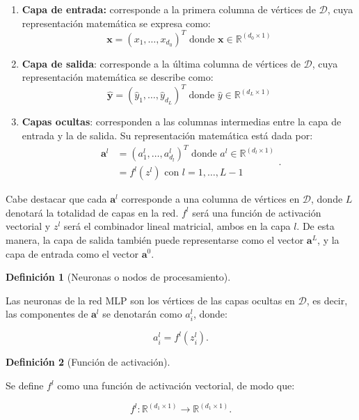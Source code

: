 \documentclass[
  us-letterpaper,
]{scrreprt}
\theoremstyle{definition}
\theoremstyle{plain}
\theoremstyle{plain}
\theoremstyle{definition}
\newtheorem{definition}{Definición}[chapter]
\theoremstyle{remark}
\begin{document}
\begin{enumerate}
\def\labelenumi{\arabic{enumi}.}
\item
  \textbf{Capa de entrada:} corresponde a la primera columna de vértices
  de \(\mathscr D\), cuya representación matemática se expresa como:
  \[\mathbf x = (x_1, \ldots, x_{d_0})^T \text{ donde } \mathbf x \in \mathbb{R}^{(d_0 \times 1)}\]
\item
  \textbf{Capa de salida}: corresponde a la última columna de vértices
  de \(\mathscr D\), cuya representación matemática se describe como:
  \[\hat{\mathbf y} = (\hat{y}_1, \ldots, \hat{y}_{d_L})^T \text{ donde } \hat{y}\in\mathbb{R}^{(d_L\times 1)}\]
\item
  \textbf{Capas ocultas}: corresponden a las columnas intermedias entre
  la capa de entrada y la de salida. Su representación matemática está
  dada por: \[\begin{split}
  \mathbf a^l &= (a_{1}^l, \ldots, a_{d_l}^l)^T \text{ donde } a^l\in\mathbb{R}^{(d_l\times 1)}\\ &= f^l(z^l)\text{ con } l = 1, \ldots, L - 1
  \end{split}.\]
\end{enumerate}

Cabe destacar que cada \(\mathbf a^l\) corresponde a una columna de
vértices en \(\mathscr D\), donde \(L\) denotará la totalidad de capas
en la red. \(f^l\) será una función de activación vectorial y \(z^l\)
será el combinador lineal matricial, ambos en la capa \(l\). De esta
manera, la capa de salida también puede representarse como el vector
\(\mathbf a^L\), y la capa de entrada como el vector \(\mathbf a^0\).

\begin{definition}[Neuronas o nodos de
procesamiento]\protect\hypertarget{def-nodos}{}\label{def-nodos}

Las neuronas de la red MLP son los vértices de las capas ocultas en
\(\mathscr D\), es decir, las componentes de \(\mathbf a^l\) se
denotarán como \(a_i^l\), donde:

\[
a_i^l=f^l(z_i^l).
\]

\end{definition}

\begin{definition}[Función de
activación]\protect\hypertarget{def-funac}{}\label{def-funac}

Se define \(f^l\) como una función de activación vectorial, de modo que:

\[
f^l: \mathbb R^{(d_1\times 1)}\rightarrow \mathbb R^{(d_1\times 1)}.
\]

\end{definition}
\end{document}
